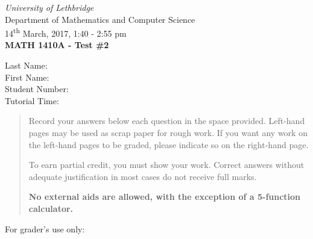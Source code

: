 \documentclass[12pt]{article}
\newcommand{\skipline}{\vspace{12pt}}
\begin{document}
\author{Instructor: Sean Fitzpatrick}
\thispagestyle{plain}
\begin{center}
\emph{University of Lethbridge}\\
Department of Mathematics and Computer Science\\
14\textsuperscript{th} March, 2017, 1:40 - 2:55 pm\\
{\bf MATH 1410A - Test \#2}\\
\end{center}
\skipline \skipline \skipline \noindent \skipline
Last Name:\underline{\hspace{50pt}{\bf Solutions}\hspace{248pt}}\\
\skipline
First Name:\underline{\hspace{50pt}{\bf The}\hspace{275pt}}\\
\skipline
Student Number:\underline{\hspace{323pt}}\\
\skipline
Tutorial Time: \underline{\hspace{320pt}}\\


\vspace{0.5in}


\begin{quote}
  Record your answers below each question in the space provided.    Left-hand pages may be used as scrap paper for rough work.  If you want any work on the left-hand pages to be graded, please indicate so on the right-hand page.
 
 \bigskip
 
To earn partial credit, you must show your work. Correct answers without adequate justification in most cases do not receive full marks.

\bigskip

{\bf No external aids are allowed, with the exception of a 5-function calculator.}
\end{quote}


\vspace{0.5in}

For grader's use only:
\end{document}
